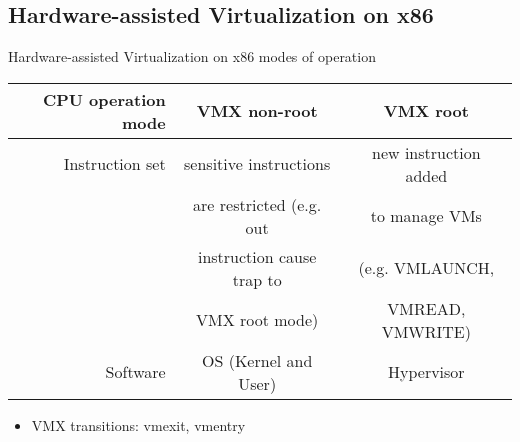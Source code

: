 \documentclass[10pt,hyperref={hyperfootnotes=false}, xcolor={usenames, dvipsnames}]{beamer}
\begin{document}

\subsection{Hardware-assisted Virtualization on x86}
\begin{frame}{Hardware-assisted Virtualization on x86} {modes of operation}
		\begin{table}[H]
		\centering
		\begin{longtable}{|r|c|c|} 
		\hline
			\textbf{CPU operation mode}	&	{\textbf{VMX non-root}} 	&	{\textbf{VMX root}} \\ \hline \hline
			Instruction set		&	sensitive instructions 		&  new instruction added \\
				                &	are restricted (e.g. out	&  to manage VMs \\ 
				                &	instruction cause trap to   & (e.g. VMLAUNCH,  \\ 
				                &	VMX root mode)              & VMREAD, VMWRITE) \\ \hline
			Software 			&	OS (Kernel and User)	&	Hypervisor \\ \hline
		\end{longtable}
		\end{table}

		\begin{itemize}
			\item {VMX transitions: vmexit, vmentry}
		\end{itemize}
\end{frame}
\end{document}
